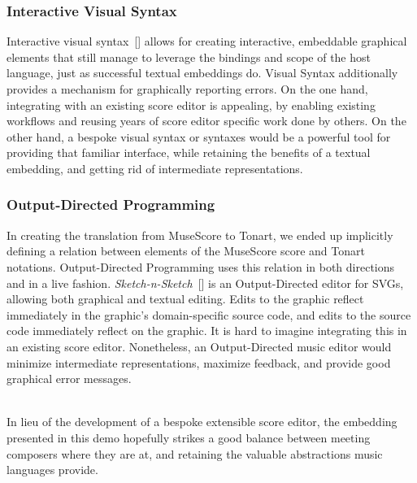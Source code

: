 \documentclass[10pt, sigplan, screen]{acmart}
\newcommand{\Ssubsubsection}[2]{\subsubsection[#1]{#2}}
\newcommand{\AutobibLink}[1]{\color{ACMPurple}{#1}}
\newcommand{\Autobibref}[1]{#1}
\providecommand{\AutobibLink}[1]{#1}
\begin{document}
\Ssubsubsection{Interactive Visual Syntax}{Interactive Visual Syntax}\label{t:x28part_x22Interactivex5fVisualx5fSyntaxx22x29}

Interactive visual syntax\Autobibref{~[\hyperref[t:x28autobib_x22Andersenx2c_Leifx2c_Ballantynex2c_Michaelx2c_and_Felleisenx2c_MatthiasAdding_interactive_visual_syntax_to_textual_codeIn_Procx2e_ACM_on_Programming_Languagesx2c_ppx2e_1x2dx2d282020httpsx3ax2fx2fdoix2eorgx2f10x2e1145x2f3428290x22x29]{\AutobibLink{3}}]} allows for creating interactive,
embeddable graphical elements that still manage to leverage the bindings and
scope of the host language, just as successful textual embeddings do.  Visual
Syntax additionally provides a mechanism for graphically reporting errors.  On
the one hand, integrating with an existing score editor is appealing, by
enabling existing workflows and reusing years of score editor specific work done
by others.  On the other hand, a bespoke visual syntax or syntaxes would be a
powerful tool for providing that familiar interface, while retaining the
benefits of a textual embedding, and getting rid of intermediate
representations.

\Ssubsubsection{Output{-}Directed Programming}{Output{-}Directed Programming}\label{t:x28part_x22Outputx2dDirectedx5fProgrammingx22x29}

In creating the translation from MuseScore to Tonart, we ended up implicitly
defining a relation between elements of the MuseScore score and Tonart
notations.  Output{-}Directed Programming uses this relation in both directions
and in a live fashion.  \emph{Sketch{-}n{-}Sketch}\Autobibref{~[\hyperref[t:x28autobib_x22Hempelx2c_Brianx2c_Lubinx2c_Justinx2c_and_Chughx2c_RaviSketchx2dnx2dSketchx3a_Outputx2dDirected_Programming_for_SVGIn_Procx2e_32nd_Annual_ACM_Symposium_on_User_Interface_Software_and_Technologyx2c_ppx2e_281x2dx2d2922019httpsx3ax2fx2fdoix2eorgx2f10x2e1145x2f3332165x2e3347925x22x29]{\AutobibLink{1}}]} is an
Output{-}Directed editor for SVGs, allowing both graphical and textual editing.
Edits to the graphic reflect immediately in the graphic{'}s domain{-}specific source
code, and edits to the source code immediately reflect on the graphic.  It is
hard to imagine integrating this in an existing score editor.  Nonetheless, an
Output{-}Directed music editor would minimize intermediate representations,
maximize feedback, and provide good graphical error messages.

\hspace*{\fill}\\
In lieu of the development of a bespoke extensible score editor, the embedding
presented in this demo hopefully strikes a good balance between meeting
composers where they are at, and retaining the valuable abstractions music
languages provide.\label{t:x28part_x28gentag_4x29x29}
\end{document}
